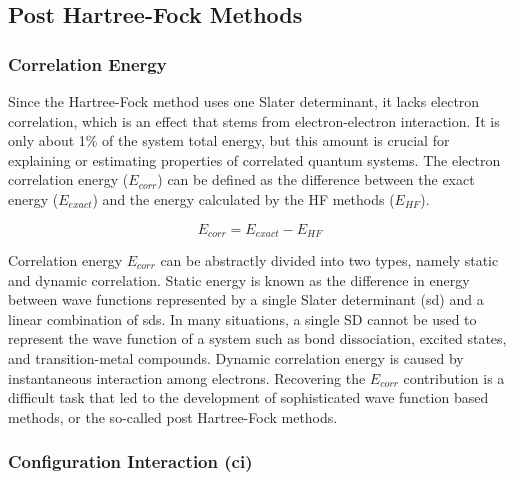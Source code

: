 \begin{refsection}
\subsection{Post Hartree-Fock Methods}

\subsubsection{Correlation Energy}


Since the Hartree-Fock method uses one Slater determinant, it lacks electron correlation, which is an effect that stems from electron-electron interaction. It is only about 1\% of the system total energy, but this amount is crucial for explaining or estimating properties of correlated quantum systems. The electron correlation energy ($ E_{corr} $) can be defined as the difference between the exact energy ($ E_{exact} $) and the energy calculated by the HF methods ($ E_{HF} $).

\begin{equation}
E_{corr} = E_{exact} - E_{HF}
\label{eq:Ecorrelation}
\end{equation}


Correlation energy $E_{corr}$ can be abstractly divided into two types, namely static and dynamic correlation. Static energy is known as the difference in energy between wave functions represented by a single Slater determinant (\acrshort{sd}) and a linear combination of \acrshort{sd}s. In many situations, a single SD cannot be used to represent the wave function of a system such as bond dissociation, excited states, and transition-metal compounds. Dynamic correlation energy is caused by instantaneous interaction among electrons. Recovering the $E_{corr}$ contribution is a difficult task that led to the development of sophisticated wave function based methods, or the so-called post Hartree-Fock methods.


\subsubsection{Configuration Interaction (\acrshort{ci})}


\end{refsection}
